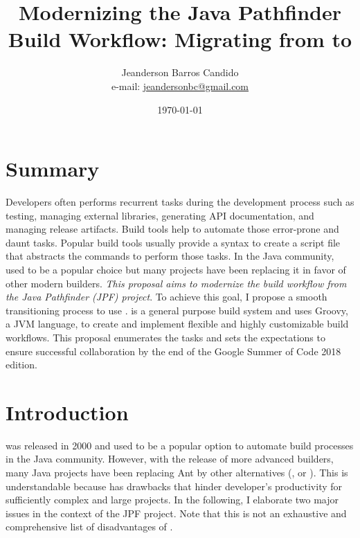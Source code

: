 \documentclass[a4paper]{article}
\author{Jeanderson Barros Candido\\e-mail: \url{jeandersonbc@gmail.com}}
\title{Modernizing the Java Pathfinder Build Workflow: Migrating from \ant{} to
\gradle{}}
\date{\today}
\begin{document}
\maketitle

\section*{Summary}

Developers often performs recurrent tasks during the development process such
as testing, managing external libraries, generating API documentation, and
managing release artifacts.
Build tools help to automate those error-prone and daunt tasks.
Popular build tools usually provide a syntax to create a script file that
abstracts the commands to perform those tasks.
In the Java community, \ant{} used to be a popular choice but many
projects have been replacing it in favor of other modern builders.
\emph{This proposal aims to modernize the build workflow from the Java
Pathfinder (JPF) project}.
To achieve this goal, I propose a smooth transitioning process to use
\gradle{}.
\gradle{} is a general purpose build system and uses Groovy, a JVM language, to
create and implement flexible and highly customizable build workflows.
This proposal enumerates the tasks and sets the expectations to ensure
successful collaboration by the end of the Google Summer of Code 2018 edition.

\section{Introduction}
\label{sec:intro}

\ant{}\cite{page:ant} was released in 2000 and used to be a popular option to
automate build processes in the Java community.
However, with the release of more advanced builders, many Java projects have
been replacing Ant by other alternatives (\eg, \gradle{}\cite{page:gradle} or
\maven{}\cite{page:maven}).
This is understandable because \ant{} has drawbacks that hinder developer's
productivity for sufficiently complex and large projects.
In the following, I elaborate two major issues in the context of the JPF
project.
Note that this is not an exhaustive and comprehensive list of disadvantages of
\ant{}.
\end{document}
